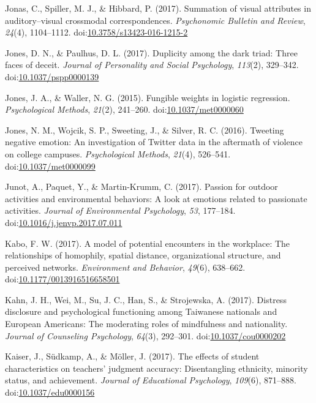 \documentclass[english,man]{apa6}
\begin{document}
\hypertarget{ref-Jonas2017}{}
Jonas, C., Spiller, M. J., \& Hibbard, P. (2017). Summation of visual
attributes in auditory--visual crossmodal correspondences.
\emph{Psychonomic Bulletin and Review}, \emph{24}(4), 1104--1112.
doi:\href{https://doi.org/10.3758/s13423-016-1215-2}{10.3758/s13423-016-1215-2}

\hypertarget{ref-Jones2017}{}
Jones, D. N., \& Paulhus, D. L. (2017). Duplicity among the dark triad:
Three faces of deceit. \emph{Journal of Personality and Social
Psychology}, \emph{113}(2), 329--342.
doi:\href{https://doi.org/10.1037/pspp0000139}{10.1037/pspp0000139}

\hypertarget{ref-Jones2015}{}
Jones, J. A., \& Waller, N. G. (2015). Fungible weights in logistic
regression. \emph{Psychological Methods}, \emph{21}(2), 241--260.
doi:\href{https://doi.org/10.1037/met0000060}{10.1037/met0000060}

\hypertarget{ref-Jones2016}{}
Jones, N. M., Wojcik, S. P., Sweeting, J., \& Silver, R. C. (2016).
Tweeting negative emotion: An investigation of Twitter data in the
aftermath of violence on college campuses. \emph{Psychological Methods},
\emph{21}(4), 526--541.
doi:\href{https://doi.org/10.1037/met0000099}{10.1037/met0000099}

\hypertarget{ref-Junot2017}{}
Junot, A., Paquet, Y., \& Martin-Krumm, C. (2017). Passion for outdoor
activities and environmental behaviors: A look at emotions related to
passionate activities. \emph{Journal of Environmental Psychology},
\emph{53}, 177--184.
doi:\href{https://doi.org/10.1016/j.jenvp.2017.07.011}{10.1016/j.jenvp.2017.07.011}

\hypertarget{ref-Kabo2017}{}
Kabo, F. W. (2017). A model of potential encounters in the workplace:
The relationships of homophily, spatial distance, organizational
structure, and perceived networks. \emph{Environment and Behavior},
\emph{49}(6), 638--662.
doi:\href{https://doi.org/10.1177/0013916516658501}{10.1177/0013916516658501}

\hypertarget{ref-Kahn2017}{}
Kahn, J. H., Wei, M., Su, J. C., Han, S., \& Strojewska, A. (2017).
Distress disclosure and psychological functioning among Taiwanese
nationals and European Americans: The moderating roles of mindfulness
and nationality. \emph{Journal of Counseling Psychology}, \emph{64}(3),
292--301.
doi:\href{https://doi.org/10.1037/cou0000202}{10.1037/cou0000202}

\hypertarget{ref-Kaiser2017}{}
Kaiser, J., Südkamp, A., \& Möller, J. (2017). The effects of student
characteristics on teachers' judgment accuracy: Disentangling ethnicity,
minority status, and achievement. \emph{Journal of Educational
Psychology}, \emph{109}(6), 871--888.
doi:\href{https://doi.org/10.1037/edu0000156}{10.1037/edu0000156}
\end{document}
